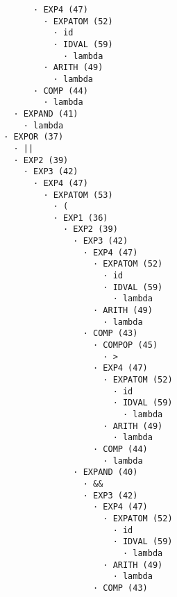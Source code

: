 \begin{enumerate}
\begin{tcolorbox}[title={Árbol sintáctico}, colback=white, breakable]
\begin{lstlisting}
                                · EXP4 (47)
                                  · EXPATOM (52)
                                    · id
                                    · IDVAL (59)
                                      · lambda
                                  · ARITH (49)
                                    · lambda
                                · COMP (44)
                                  · lambda
                            · EXPAND (41)
                              · lambda
                          · EXPOR (37)
                            · ||
                            · EXP2 (39)
                              · EXP3 (42)
                                · EXP4 (47)
                                  · EXPATOM (53)
                                    · (
                                    · EXP1 (36)
                                      · EXP2 (39)
                                        · EXP3 (42)
                                          · EXP4 (47)
                                            · EXPATOM (52)
                                              · id
                                              · IDVAL (59)
                                                · lambda
                                            · ARITH (49)
                                              · lambda
                                          · COMP (43)
                                            · COMPOP (45)
                                              · >
                                            · EXP4 (47)
                                              · EXPATOM (52)
                                                · id
                                                · IDVAL (59)
                                                  · lambda
                                              · ARITH (49)
                                                · lambda
                                            · COMP (44)
                                              · lambda
                                        · EXPAND (40)
                                          · &&
                                          · EXP3 (42)
                                            · EXP4 (47)
                                              · EXPATOM (52)
                                                · id
                                                · IDVAL (59)
                                                  · lambda
                                              · ARITH (49)
                                                · lambda
                                            · COMP (43)

\end{lstlisting}
\end{tcolorbox}
\end{enumerate}

